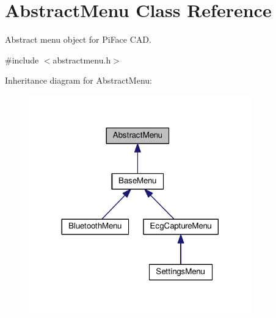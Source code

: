 \hypertarget{classAbstractMenu}{}\section{Abstract\+Menu Class Reference}
\label{classAbstractMenu}


Abstract menu object for Pi\+Face C\+AD.  




{\ttfamily \#include $<$abstractmenu.\+h$>$}



Inheritance diagram for Abstract\+Menu\+:\nopagebreak
\begin{figure}[H]
\begin{center}
\leavevmode
\includegraphics[width=272pt]{classAbstractMenu__inherit__graph}
\end{center}
\end{figure}
